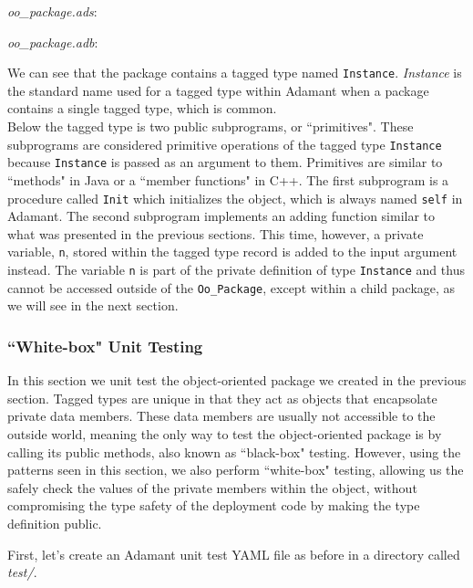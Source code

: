 \textit{oo\_package.ads}:


\textit{oo\_package.adb}:


We can see that the package contains a tagged type named \texttt{Instance}. \textit{Instance} is the standard name used for a tagged type within Adamant when a package contains a single tagged type, which is common. \\

Below the tagged type is two public subprograms, or ``primitives". These subprograms are considered primitive operations of the tagged type \texttt{Instance} because \texttt{Instance} is passed as an argument to them. Primitives are similar to ``methods" in Java or a ``member functions" in C++. The first subprogram is a procedure called \texttt{Init} which initializes the object, which is always named \texttt{self} in Adamant. The second subprogram implements an adding function similar to what was presented in the previous sections. This time, however, a private variable, \texttt{n}, stored within the tagged type record is added to the input argument instead. The variable \texttt{n} is part of the private definition of type \texttt{Instance} and thus cannot be accessed outside of the \texttt{Oo\_Package}, except within a child package, as we will see in the next section.

\subsubsection{``White-box" Unit Testing}

In this section we unit test the object-oriented package we created in the previous section. Tagged types are unique in that they act as objects that encapsolate private data members. These data members are usually not accessible to the outside world, meaning the only way to test the object-oriented package is by calling its public methods, also known as ``black-box" testing. However, using the patterns seen in this section, we also perform ``white-box" testing, allowing us the safely check the values of the private members within the object, without compromising the type safety of the deployment code by making the type definition public.

First, let's create an Adamant unit test YAML file as before in a directory called \textit{test/}.

